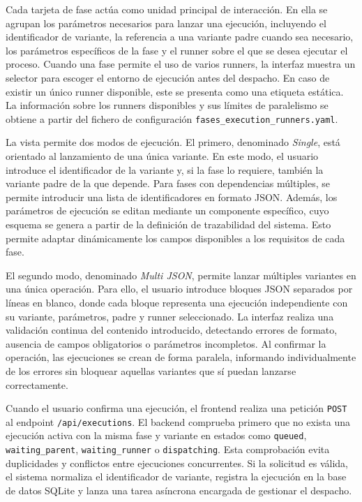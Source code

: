 Cada tarjeta de fase actúa como unidad principal de interacción. En ella se agrupan los parámetros necesarios para lanzar una ejecución, incluyendo el identificador de variante, la referencia a una variante padre cuando sea necesario, los parámetros específicos de la fase y el runner sobre el que se desea ejecutar el proceso. Cuando una fase permite el uso de varios runners, la interfaz muestra un selector para escoger el entorno de ejecución antes del despacho. En caso de existir un único runner disponible, este se presenta como una etiqueta estática. La información sobre los runners disponibles y sus límites de paralelismo se obtiene a partir del fichero de configuración \texttt{fases\_execution\_runners.yaml}.

La vista permite dos modos de ejecución. El primero, denominado \textit{Single}, está orientado al lanzamiento de una única variante. En este modo, el usuario introduce el identificador de la variante y, si la fase lo requiere, también la variante padre de la que depende. Para fases con dependencias múltiples, se permite introducir una lista de identificadores en formato JSON. Además, los parámetros de ejecución se editan mediante un componente específico, cuyo esquema se genera a partir de la definición de trazabilidad del sistema. Esto permite adaptar dinámicamente los campos disponibles a los requisitos de cada fase.

El segundo modo, denominado \textit{Multi JSON}, permite lanzar múltiples variantes en una única operación. Para ello, el usuario introduce bloques JSON separados por líneas en blanco, donde cada bloque representa una ejecución independiente con su variante, parámetros, padre y runner seleccionado. La interfaz realiza una validación continua del contenido introducido, detectando errores de formato, ausencia de campos obligatorios o parámetros incompletos. Al confirmar la operación, las ejecuciones se crean de forma paralela, informando individualmente de los errores sin bloquear aquellas variantes que sí puedan lanzarse correctamente.

Cuando el usuario confirma una ejecución, el frontend realiza una petición \texttt{POST} al endpoint \texttt{/api/executions}. El backend comprueba primero que no exista una ejecución activa con la misma fase y variante en estados como \texttt{queued}, \texttt{waiting\_parent}, \texttt{waiting\_runner} o \texttt{dispatching}. Esta comprobación evita duplicidades y conflictos entre ejecuciones concurrentes. Si la solicitud es válida, el sistema normaliza el identificador de variante, registra la ejecución en la base de datos SQLite y lanza una tarea asíncrona encargada de gestionar el despacho.

